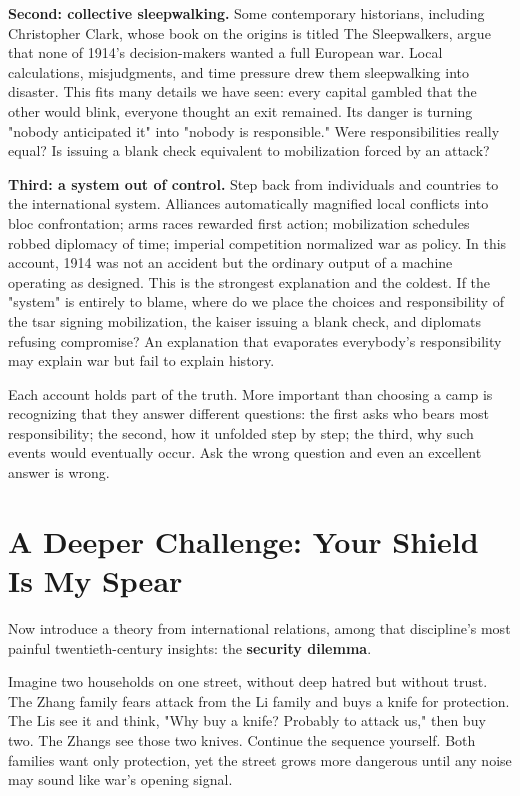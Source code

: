 \textbf{Second: collective sleepwalking.} Some contemporary historians, including Christopher Clark, whose book on the origins is titled The Sleepwalkers, argue that none of 1914's decision-makers wanted a full European war. Local calculations, misjudgments, and time pressure drew them sleepwalking into disaster. This fits many details we have seen: every capital gambled that the other would blink, everyone thought an exit remained. Its danger is turning "nobody anticipated it" into "nobody is responsible." Were responsibilities really equal? Is issuing a blank check equivalent to mobilization forced by an attack?

\textbf{Third: a system out of control.} Step back from individuals and countries to the international system. Alliances automatically magnified local conflicts into bloc confrontation; arms races rewarded first action; mobilization schedules robbed diplomacy of time; imperial competition normalized war as policy. In this account, 1914 was not an accident but the ordinary output of a machine operating as designed. This is the strongest explanation and the coldest. If the "system" is entirely to blame, where do we place the choices and responsibility of the tsar signing mobilization, the kaiser issuing a blank check, and diplomats refusing compromise? An explanation that evaporates everybody's responsibility may explain war but fail to explain history.

Each account holds part of the truth. More important than choosing a camp is recognizing that they answer different questions: the first asks who bears most responsibility; the second, how it unfolded step by step; the third, why such events would eventually occur. Ask the wrong question and even an excellent answer is wrong.

\section{A Deeper Challenge: Your Shield Is My Spear}
Now introduce a theory from international relations, among that discipline's most painful twentieth-century insights: the \textbf{security dilemma}.

Imagine two households on one street, without deep hatred but without trust. The Zhang family fears attack from the Li family and buys a knife for protection. The Lis see it and think, "Why buy a knife? Probably to attack us," then buy two. The Zhangs see those two knives. Continue the sequence yourself. Both families want only protection, yet the street grows more dangerous until any noise may sound like war's opening signal.

